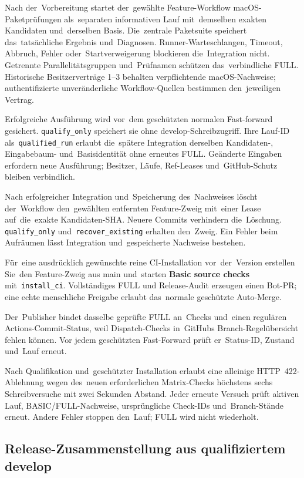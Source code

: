 \documentclass[11pt,a4paper]{article}
\newcommand{\ui}[1]{\textbf{#1}}
\newcommand{\codeword}[1]{\nolinkurl{#1}}
\begin{document}
Nach der~Vorbereitung startet der~gewählte Feature-Workflow macOS-Paketprüfungen
als~separaten informativen Lauf mit~demselben exakten Kandidaten und~derselben
Basis. Die~zentrale Paketsuite speichert das~tatsächliche Ergebnis
und~Diagnosen.
Runner-Warteschlangen, Timeout, Abbruch, Fehler oder~Startverweigerung
blockieren
die~Integration nicht. Getrennte Parallelitätsgruppen und~Prüfnamen schützen
das~verbindliche FULL. Historische Besitzerverträge 1--3 behalten verpflichtende
macOS-Nachweise; authentifizierte unveränderliche Workflow-Quellen bestimmen
den~jeweiligen Vertrag.

Erfolgreiche Ausführung wird vor~dem geschützten normalen Fast-forward
gesichert. \codeword{qualify_only} speichert sie ohne develop-Schreibzugriff.
Ihre Lauf-ID als~\codeword{qualified_run} erlaubt die~spätere Integration
derselben Kandidaten-, Eingabebaum- und~Basisidentität ohne erneutes FULL.
Geänderte Eingaben erfordern neue Ausführung; Besitzer, Läufe, Ref-Leases
und~GitHub-Schutz bleiben verbindlich.

Nach erfolgreicher Integration und~Speicherung des~Nachweises löscht
der~Workflow
den~gewählten entfernten Feature-Zweig mit~einer Lease auf~die~exakte
Kandidaten-SHA. Neuere Commits verhindern die~Löschung.
\codeword{qualify_only} und~\codeword{recover_existing} erhalten den~Zweig.
Ein Fehler beim Aufräumen lässt Integration und~gespeicherte Nachweise bestehen.

Für~eine ausdrücklich gewünschte reine CI-Installation vor~der~Version
erstellen Sie~den Feature-Zweig aus main und~starten
\ui{Basic source checks} mit~\codeword{install_ci}. Vollständiges FULL und
Release-Audit erzeugen einen Bot-PR; eine echte menschliche Freigabe erlaubt
das~normale geschützte Auto-Merge.

Der~Publisher bindet dasselbe geprüfte FULL an~Checks und~einen regulären
Actions-Commit-Status, weil Dispatch-Checks in~GitHubs Branch-Regelübersicht
fehlen können. Vor jedem geschützten Fast-Forward prüft er~Status-ID,
Zustand und~Lauf erneut.

Nach Qualifikation und~geschützter Installation erlaubt eine alleinige
HTTP~422-Ablehnung wegen des~neuen erforderlichen Matrix-Checks höchstens sechs
Schreibversuche mit zwei Sekunden Abstand. Jeder erneute Versuch prüft aktiven
Lauf, BASIC/FULL-Nachweise, ursprüngliche Check-IDs und~Branch-Stände erneut.
Andere Fehler stoppen den~Lauf; FULL wird nicht wiederholt.

\subsection{Release-Zusammenstellung aus qualifiziertem develop}
\end{document}
